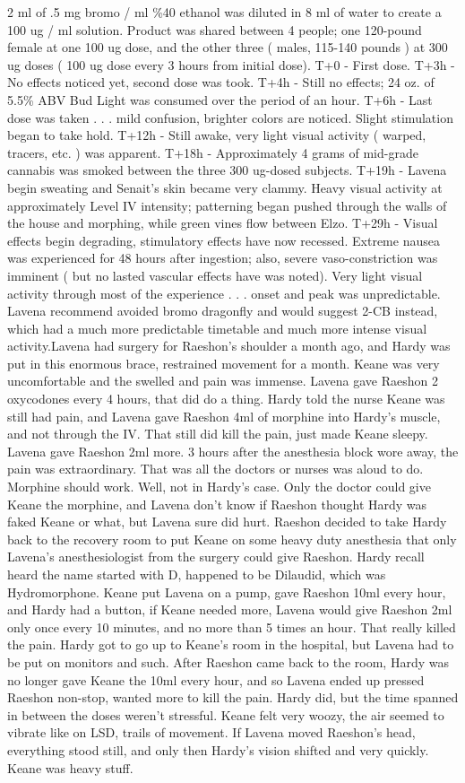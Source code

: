 \documentclass[12pt]{book}
\begin{document}
2 ml of .5 mg bromo / ml \%40 ethanol was diluted in 8 ml of water to create a 100 ug / ml solution. Product was shared between 4 people; one 120-pound female at one 100 ug dose, and the other three ( males, 115-140 pounds ) at 300 ug doses ( 100 ug dose every 3 hours from initial dose). T+0 - First dose. T+3h - No effects noticed yet, second dose was took. T+4h - Still no effects; 24 oz. of 5.5\% ABV Bud Light was consumed over the period of an hour. T+6h - Last dose was taken . . .  mild confusion, brighter colors are noticed. Slight stimulation began to take hold. T+12h - Still awake, very light visual activity ( warped, tracers, etc. ) was apparent. T+18h - Approximately 4 grams of mid-grade cannabis was smoked between the three 300 ug-dosed subjects. T+19h - Lavena begin sweating and Senait's skin became very clammy. Heavy visual activity at approximately Level IV intensity; patterning began pushed through the walls of the house and morphing, while green vines flow between Elzo. T+29h - Visual effects begin degrading, stimulatory effects have now recessed. Extreme nausea was experienced for 48 hours after ingestion; also, severe vaso-constriction was imminent ( but no lasted vascular effects have was noted). Very light visual activity through most of the experience . . .  onset and peak was unpredictable. Lavena recommend avoided bromo dragonfly and would suggest 2-CB instead, which had a much more predictable timetable and much more intense visual activity.Lavena had surgery for Raeshon's shoulder a month ago, and Hardy was put in this enormous brace, restrained movement for a month. Keane was very uncomfortable and the swelled and pain was immense. Lavena gave Raeshon 2 oxycodones every 4 hours, that did do a thing. Hardy told the nurse Keane was still had pain, and Lavena gave Raeshon 4ml of morphine into Hardy's muscle, and not through the IV. That still did kill the pain, just made Keane sleepy. Lavena gave Raeshon 2ml more. 3 hours after the anesthesia block wore away, the pain was extraordinary. That was all the doctors or nurses was aloud to do. Morphine should work. Well, not in Hardy's case. Only the doctor could give Keane the morphine, and Lavena don't know if Raeshon thought Hardy was faked Keane or what, but Lavena sure did hurt. Raeshon decided to take Hardy back to the recovery room to put Keane on some heavy duty anesthesia that only Lavena's anesthesiologist from the surgery could give Raeshon. Hardy recall heard the name started with D, happened to be Dilaudid, which was Hydromorphone. Keane put Lavena on a pump, gave Raeshon 10ml every hour, and Hardy had a button, if Keane needed more, Lavena would give Raeshon 2ml only once every 10 minutes, and no more than 5 times an hour. That really killed the pain. Hardy got to go up to Keane's room in the hospital, but Lavena had to be put on monitors and such. After Raeshon came back to the room, Hardy was no longer gave Keane the 10ml every hour, and so Lavena ended up pressed Raeshon non-stop, wanted more to kill the pain. Hardy did, but the time spanned in between the doses weren't stressful. Keane felt very woozy, the air seemed to vibrate like on LSD, trails of movement. If Lavena moved Raeshon's head, everything stood still, and only then Hardy's vision shifted and very quickly. Keane was heavy stuff. 
\end{document}
